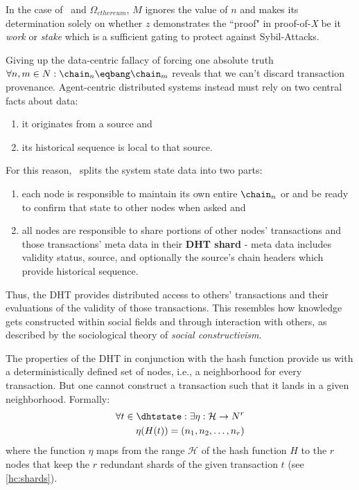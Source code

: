 \documentclass[twocolumn,showpacs,%
  nofootinbib,aps,superscriptaddress,%
  eqsecnum,prd,notitlepage,showkeys,10pt]{revtex4-1}
\begin{document}
In the case of \sbtc\ and $\Omega_{ethereum}$, $M$ ignores the value of $n$ and makes its determination solely on whether $z$ demonstrates the ``proof" in proof-of-\textit{X} be it \textit{work} or \textit{stake} which is a sufficient gating to protect against Sybil-Attacks.

Giving up the data-centric fallacy of forcing one absolute truth $\forall n,m \in N: \chain_n\eqbang\chain_m$ reveals that we can't discard transaction provenance.
Agent-centric distributed systems instead must rely on two central facts about data:
\begin{enumerate}
\item it originates from a source and
\item its historical sequence is local to that source. 
\end{enumerate}
For this reason, \shc\ splits the system state data into two parts:
\begin{enumerate}
\item each node is responsible to maintain its own entire $\chain_n$ or  and be ready to confirm that state to other nodes when asked and
\item all nodes are responsible to share portions of other nodes' transactions and those transactions' meta data in their \textbf{DHT shard} - meta data includes validity status, source, and optionally the source's chain headers which provide historical sequence.
\end{enumerate} 

Thus, the DHT provides distributed access to others' transactions and their
evaluations of the validity of those transactions.
This resembles how knowledge gets constructed within social fields and through interaction with others, as described by the sociological theory of \textit{social constructivism}.

The properties of the DHT in conjunction with the hash function provide us with a
deterministically defined set of nodes, i.e., a neighborhood for every transaction.
But one cannot construct a transaction such that it lands in a given neighborhood.
Formally:
\begin{equation}
\begin{split}
\forall t\in\dhtstate: \exists \eta: \mathcal{H}\rightarrow N^r\\
\eta(H(t))=(n_1, n_2, \dots, n_r)
\end{split}
\end{equation}
where the function $\eta$ maps from the range $\mathcal{H}$ of the hash function $H$
to the $r$ nodes that keep the $r$ redundant shards of the given transaction $t$ (see \ref{hc:shards}).
\end{document}
